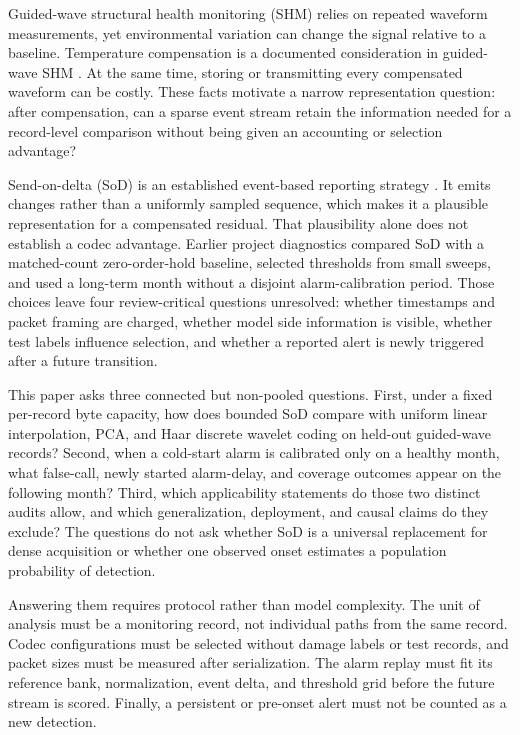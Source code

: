 Guided-wave structural health monitoring (SHM) relies on repeated waveform
measurements, yet environmental variation can change the signal relative to a
baseline. Temperature compensation is a documented consideration in
guided-wave SHM \cite{croxford2010}. At the same time, storing or transmitting
every compensated waveform can be costly. These facts motivate a narrow
representation question: after compensation, can a sparse event stream retain
the information needed for a record-level comparison without being given an
accounting or selection advantage?

Send-on-delta (SoD) is an established event-based reporting strategy
\cite{miskowicz2006}. It emits changes rather than a uniformly sampled
sequence, which makes it a plausible representation for a compensated
residual. That plausibility alone does not establish a codec advantage.
Earlier project diagnostics compared SoD with a matched-count
zero-order-hold baseline, selected thresholds from small sweeps, and used a
long-term month without a disjoint alarm-calibration period. Those choices
leave four review-critical questions unresolved: whether timestamps and
packet framing are charged, whether model side information is visible,
whether test labels influence selection, and whether a reported alert is
newly triggered after a future transition.

This paper asks three connected but non-pooled questions. First, under a fixed
per-record byte capacity, how does bounded SoD compare with uniform linear
interpolation, PCA, and Haar discrete wavelet coding on held-out guided-wave
records? Second, when a cold-start alarm is calibrated only on a healthy
month, what false-call, newly started alarm-delay, and coverage outcomes
appear on the following month? Third, which applicability statements do those
two distinct audits allow, and which generalization, deployment, and causal
claims do they exclude? The questions do not ask whether SoD is a universal
replacement for dense acquisition or whether one observed onset estimates a
population probability of detection.

Answering them requires protocol rather than model complexity. The unit of
analysis must be a monitoring record, not individual paths from the same
record. Codec configurations must be selected without damage labels or test
records, and packet sizes must be measured after serialization. The alarm
replay must fit its reference bank, normalization, event delta, and threshold
grid before the future stream is scored. Finally, a persistent or pre-onset
alert must not be counted as a new detection.

